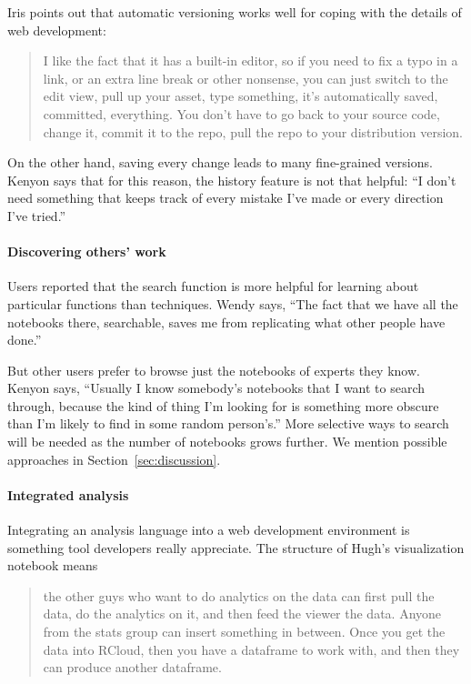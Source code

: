Iris points out that automatic versioning works well for coping with
the details of web development:
\begin{quote}
I like the fact that it has a built-in editor, so
if you need to fix a typo in a link, or an extra line break or other
nonsense, you can just switch to the edit view, pull up your asset, type
something, it's automatically saved, committed, everything. You don't have to go
back to your source code, change it, commit it to the repo, pull the repo to
your distribution version.
\end{quote}

On the other hand, saving every change leads to many fine-grained
versions. Kenyon says that for this reason, the history feature is not that
helpful: ``I don't need something that keeps track of every mistake I've made or
every direction I've tried.''

\paragraph*{Discovering others' work} Users reported that the search function is
more helpful for learning about
particular functions than techniques. Wendy says, ``The fact that we have
all the notebooks there, searchable, saves me from replicating what other people
have done.''

But other users prefer to browse just the notebooks of experts they
know. Kenyon says, ``Usually I know somebody's notebooks that I want to search
through, because  the kind of thing I'm looking for is something
more obscure than I'm likely to find in some random person's.''
More selective ways to search will be needed as the number of notebooks
grows further. We mention possible approaches in Section~\ref{sec:discussion}.

\paragraph*{Integrated analysis} Integrating an analysis language into a web
development environment is something tool developers really appreciate.
The structure of Hugh's visualization notebook means
\begin{quote}
the other guys who want to do analytics on the data can first pull
the data, do the analytics on it, and then feed the viewer the data.
Anyone from the stats group can insert something in between.
Once you get the data into RCloud, then you have a dataframe
to work with, and then they can produce another dataframe.
\end{quote}

